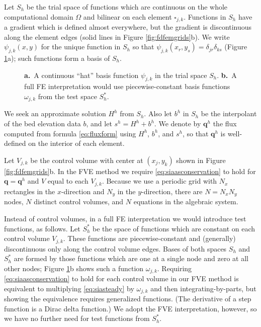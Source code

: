 \documentclass[twocolumn,a4paper]{igs}
\newcommand\bq{\mathbf{q}}
\begin{document}
Let $S_h$ be the trial space of functions which are continuous on the whole computational domain $\Omega$ and bilinear on each element $\square_{j,k}$.  Functions in $S_h$ have a gradient which is defined almost everywhere, but the gradient is discontinuous along the element edges (solid lines in Figure \ref{fig:fdfemgrids}b).  We write $\psi_{j,k}(x,y)$ for the unique function in $S_h$ so that $\psi_{j,k}(x_r,y_s) = \delta_{jr} \delta_{ks}$ (Figure \ref{fig:fembases}a); such functions form a basis of $S_h$.

\begin{figure}[ht]
\begin{center}
 \quad 
\end{center}
\caption{\textbf{a.}~A continuous ``hat'' basis function $\psi_{j,k}$ in the trial space $S_h$.  \textbf{b.}~A full FE interpretation would use piecewise-constant basis functions $\omega_{j,k}$ from the test space $S_h^*$.}
\label{fig:fembases}
\end{figure}

We seek an approximate solution $H^h$ from $S_h$.  Also let $b^h$ in $S_h$ be the interpolant of the bed elevation data $b$, and let $s^h=H^h+b^h$.  We denote by $\bq^h$ the flux computed from formula \eqref{eq:fluxform} using $H^h$, $b^h$, and $s^h$, so that $\bq^h$ is well-defined on the interior of each element.

Let $V_{j,k}$ be the control volume with center at $(x_j,y_k)$ shown in Figure \ref{fig:fdfemgrids}b.  In the FVE method we require \eqref{eq:siaasconservation} to hold for $\bq=\bq^h$ and $V$ equal to each $V_{j,k}$.  Because we use a periodic grid with $N_x$ rectangles in the $x$-direction and $N_y$ in the $y$-direction, there are $N=N_xN_y$ nodes, $N$ distinct control volumes, and $N$ equations in the algebraic system.

Instead of control volumes, in a full FE interpretation we would introduce test functions, as follows.  Let $S_h^*$ be the space of functions which are constant on each control volume $V_{j,k}$.  These functions are piecewise-constant and (generally) discontinuous only along the control volume edges.  Bases of both spaces $S_h$ and $S_h^*$ are formed by those functions which are one at a single node and zero at all other nodes; Figure \ref{fig:fembases}b shows such a function $\omega_{j,k}$.  Requiring \eqref{eq:siaasconservation} to hold for each control volume in our FVE method is equivalent to multiplying \eqref{eq:siasteady} by $\omega_{j,k}$ and then integrating-by-parts, but showing the equivalence requires generalized functions.  (The derivative of a step function is a Dirac delta function.)  We adopt the FVE interpretation, however, so we have no further need for test functions from $S_h^*$.
\end{document}
